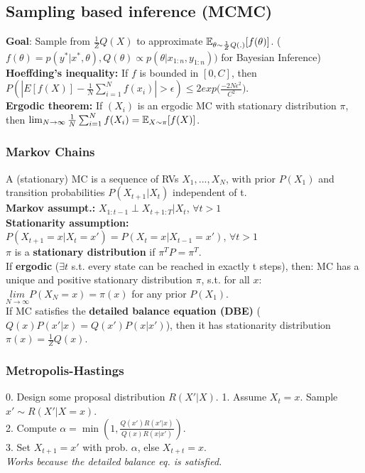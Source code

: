 \subsection{Sampling based inference (MCMC)}
\textbf{Goal}: Sample from $\frac{1}{Z}Q(X)$ to approximate
$\mathbb{E}_{\theta\sim\frac{1}{Z}Q(.)}[f(\theta)]$. ($f(\theta) = p(y^*|x^*,\theta), Q(\theta)\propto p(\theta|x_{1:n},y_{1:n}))$ for Bayesian Inference)\\
\textbf{Hoeffding's inequality:} If $f$ is bounded in $[0, C]$, then
$P(|E[f(X)]-\frac{1}{N}\sum_{i=1}^N f(x_i)| > \epsilon) \leq 2exp\big( \frac{-2N\epsilon^2}{C^2}\big)$.\\
\textbf{Ergodic theorem:} If $(X_i)$ is an ergodic MC with stationary distribution $\pi$, then
$\lim_{N\to\infty}\frac{1}{N}\sum_{i=1}^{N}f(X_i) = \mathbb{E}_{X\sim\pi}[f(X)]$. 

\subsubsection{Markov Chains}
A (stationary) MC is a sequence of RVs $X_1, ..., X_N$, with prior $P(X_1)$ and transition probabilities $P(X_{t+1}|X_t)$ independent of t.\\
\textbf{Markov assumpt.:} $X_{1:t-1}\perp X_{t+1:T}|X_t$, $\forall t>1$\\
\textbf{Stationarity assumption:}\\
$P(X_{t+1}=x|X_t=x')=P(X_{t}=x|X_{t-1}=x')$, $\forall t>1$\\
$\pi$ is a \textbf{stationary distribution} if $\pi^TP = \pi^T$.\\
If \textbf{ergodic} ($\exists t$ s.t. every state can be reached in exactly t steps), then: MC has a unique and positive stationary distribution $\pi$, s.t. for all $x$:\\
            $\underset{N\rightarrow\infty}{lim}P(X_N=x)=\pi(x)$ for any prior $P(X_1)$.\\
If MC satisfies the \textbf{detailed balance equation (DBE)} ($Q(x)P(x'|x)=Q(x')P(x|x')$), then it has stationarity distribution $\pi(x)=\frac{1}{Z}Q(x)$.

\subsubsection{Metropolis-Hastings}
0. Design some proposal distribution $R(X'|X)$.
1. Assume $X_t = x$. Sample $x' \sim R(X'|X=x)$.\\
2. Compute $\alpha = \min(1, \frac{Q(x')R(x'|x)}{Q(x)R(x|x')})$.\\
3. Set $X_{t+1} = x'$ with prob. $\alpha$, else $X_{t+t} = x$.
{\tiny\CircArrowRight{}}\\
\emph{Works because the detailed balance eq. is satisfied.}
